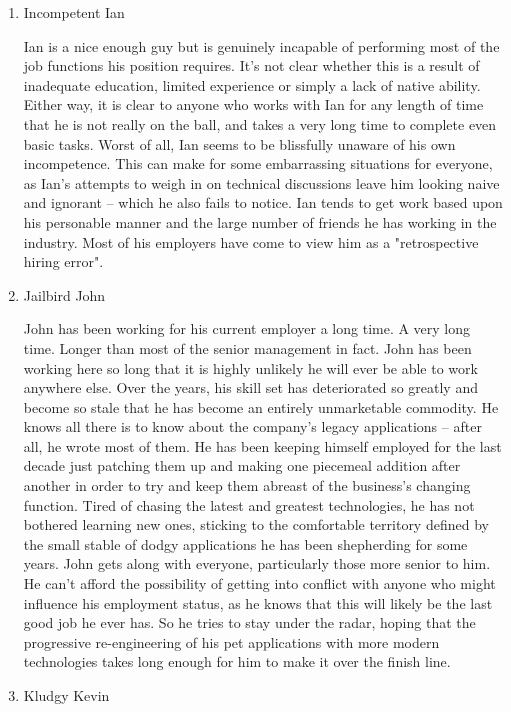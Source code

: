 \documentclass{article}
\begin{document}
\begin{enumerate}
\item Incompetent Ian
\label{sec:orgheadline12}

Ian is a nice enough guy but is genuinely incapable of performing most
of the job functions his position requires. It's not clear whether this
is a result of inadequate education, limited experience or simply a lack
of native ability. Either way, it is clear to anyone who works with Ian
for any length of time that he is not really on the ball, and takes a
very long time to complete even basic tasks. Worst of all, Ian seems to
be blissfully unaware of his own incompetence. This can make for some
embarrassing situations for everyone, as Ian's attempts to weigh in on
technical discussions leave him looking naive and ignorant -- which he
also fails to notice. Ian tends to get work based upon his personable
manner and the large number of friends he has working in the industry.
Most of his employers have come to view him as a "retrospective hiring
error".

\item Jailbird John
\label{sec:orgheadline13}

John has been working for his current employer a long time. A very long
time. Longer than most of the senior management in fact. John has been
working here so long that it is highly unlikely he will ever be able to
work anywhere else. Over the years, his skill set has deteriorated so
greatly and become so stale that he has become an entirely unmarketable
commodity. He knows all there is to know about the company's legacy
applications -- after all, he wrote most of them. He has been keeping
himself employed for the last decade just patching them up and making
one piecemeal addition after another in order to try and keep them
abreast of the business's changing function. Tired of chasing the latest
and greatest technologies, he has not bothered learning new ones,
sticking to the comfortable territory defined by the small stable of
dodgy applications he has been shepherding for some years. John gets
along with everyone, particularly those more senior to him. He can't
afford the possibility of getting into conflict with anyone who might
influence his employment status, as he knows that this will likely be
the last good job he ever has. So he tries to stay under the radar,
hoping that the progressive re-engineering of his pet applications with
more modern technologies takes long enough for him to make it over the
finish line.

\item Kludgy Kevin
\label{sec:orgheadline14}


\end{enumerate}
\end{document}

